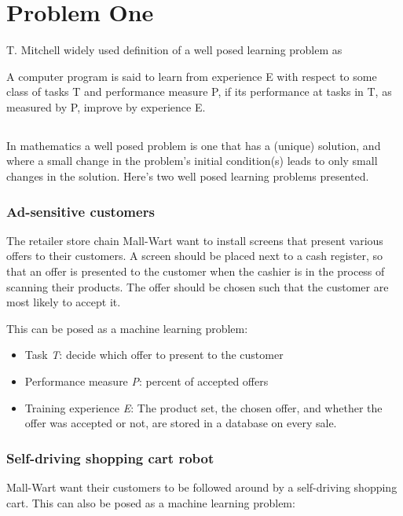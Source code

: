 \documentclass[00-main.tex]{subfiles}
\begin{document}
\section{Problem One}
T. Mitchell widely used definition of a well posed learning problem as
\begin{listing}
A computer program is said to learn from experience E with respect to some
class of tasks T and performance measure P, if its performance at tasks in T,
as measured by P, improve by experience E.
\end{listing}

\subsection{}
In mathematics a well posed problem is one that has a (unique) solution, and where a
small change in the problem's initial condition(s) leads to only small changes in the solution.
Here's two well posed learning problems presented.

\subsubsection{Ad-sensitive customers}
The retailer store chain Mall-Wart want to install screens that present various offers to their 
customers. A screen should be placed next to a cash register, so that an offer is presented to 
the customer when the cashier is in the process of scanning their products. The offer should be
chosen such that the customer are most likely to accept it.

This can be posed as a machine learning problem:

\begin{itemize}
  \item Task \textit{T}: decide which offer to present to the customer
  \item Performance measure \textit{P}: percent of accepted offers
  \item Training experience \textit{E}: The product set, the chosen offer, and whether the offer was 
  accepted or not, are stored in a database on every sale.
\end{itemize}

\subsubsection{Self-driving shopping cart robot}
Mall-Wart want their customers to be followed around by a self-driving shopping cart. This can also 
be posed as a machine learning problem:
\end{document}
